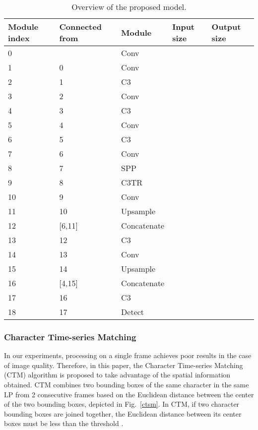 \documentclass[conference]{IEEEtran}
\begin{document}
\begin{table}[h!]
  \begin{center}
    \centering
    \caption{Overview of the proposed model.}
    \label{tab:table1}
\begin{tabular}{|p{8mm}|p{12mm}|p{13mm}|p{18mm}|p{16mm}|}
    \hline
      \textbf{Module index} & \textbf{Connected from} & \textbf{Module}& \textbf{Input size}& \textbf{Output size}\\
      \hline
      0 &   & Conv &  & \\
      1 & 0 & Conv &  & \\
      2 & 1 & C3 &  &  \\
      3 & 2 & Conv & & \\
      4 & 3 & C3 & & \\
      5 & 4 & Conv & & \\
      6 & 5 & C3 & & \\
      7 & 6 & Conv & & \\
      8 & 7 & SPP & & \\
      9 & 8 & C3TR & & \\
      10 & 9 & Conv & & \\
      11 & 10 & Upsample & & \\
      12 & [6,11] & Concatenate & \newline & \\
      13 & 12 & C3 & & \\
      14 & 13 & Conv & & \\
      15 & 14 & Upsample & & \\
      16 & [4,15] & Concatenate & \newline & \\
      17 & 16 & C3 & & \\
      18 & 17 & Detect & & \\
      \hline
    \end{tabular}
    \label{table1}
  \end{center}
\end{table}
\subsubsection{Character Time-series Matching}\label{SCM}












In our experiments, processing on a single frame achieves poor results in the case of image quality. Therefore, in this paper, the Character Time-series Matching (CTM) algorithm is proposed to take advantage of the spatial information obtained. CTM combines two bounding boxes of the same character in the same LP from 2 consecutive frames based on the Euclidean distance between the center of the two bounding boxes, depicted in Fig.~\ref{ctsm}.  
In CTM, if two character bounding boxes are joined together, the Euclidean distance between its center boxes  must be less than the threshold .
\end{document}
